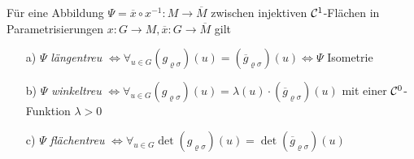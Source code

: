 \begin{satz}\label{satz224}
 Für eine Abbildung \(\Psi = \overline x \circ x^{-1} \colon M \to \overline M\) zwischen injektiven \(\mathcal{C}^1\)-Flächen in Parametrisierungen \(x \colon G \to M, \overline x \colon G \to \overline M\) gilt
 \begin{enumerate}
  \item[a)] \(\Psi\) \textit{längentreu} \(\Leftrightarrow \forall_{u \in G} (g_{\varrho \sigma})(u) = (\overline g_{\varrho \sigma})(u) \Leftrightarrow \Psi\) Isometrie
  \item[b)] \(\Psi\) \textit{winkeltreu} \(\Leftrightarrow \forall_{u \in G} (g_{\varrho \sigma})(u) = \lambda(u) \cdot (\overline g_{\varrho \sigma})(u)\) mit einer \(\mathcal{C}^0\)-Funktion \(\lambda > 0\)
  \item[c)] \(\Psi\) \textit{flächentreu} \(\Leftrightarrow \forall_{u \in G} \det (g_{\varrho \sigma})(u) = \det (\overline g_{\varrho \sigma})(u)\)
 \end{enumerate}

\end{satz}

